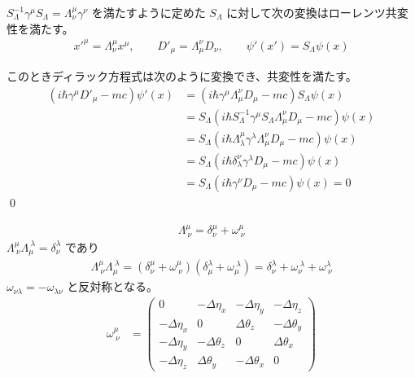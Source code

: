 \documentclass[uplatex,dvipdfmx,a4paper,11pt]{jlreq}
\makeatletter
\numberwithin{equation}{section}
\theoremstyle{definition}
\renewenvironment{proof}[1][\proofname]{\par
  \normalfont
  \topsep6\p@\@plus6\p@ \trivlist
  \item[\hskip\labelsep{\bfseries #1}\@addpunct{\bfseries}]\ignorespaces\quad\par
}{%
  \qed\endtrivlist\@endpefalse
}
\renewcommand\proofname{証明}
\makeatother
\begin{document}
\begin{theorem}[ローレンツ共変性]
  $S_\Lambda^{-1}\gamma^\mu S_\Lambda = \Lambda_\nu^\mu\gamma^\nu$ を満たすように定めた $S_\Lambda$ に対して次の変換はローレンツ共変性を満たす。
  \begin{align}
    x'^\mu = \Lambda^\mu_\nu x^\mu, \qquad D'_\mu = \Lambda_\mu^\nu D_\nu, \qquad \psi'(x') = S_\Lambda\psi(x)
  \end{align}
\end{theorem}
\begin{proof}
  このときディラック方程式は次のように変換でき、共変性を満たす。
  \begin{align}
    (i\hbar\gamma^\mu D'_\mu - mc)\psi'(x) & = (i\hbar\gamma^\mu \Lambda^\nu_\mu D_\mu - mc)S_\Lambda\psi(x)                           \\
                                           & = S_\Lambda(i\hbar S_\Lambda^{-1}\gamma^\mu S_\Lambda\Lambda_\mu^\nu D_\mu - mc)\psi(x)   \\
                                           & = S_\Lambda(i\hbar\Lambda_{\lambda}^{\mu}\gamma^\lambda\Lambda_\mu^\nu D_\mu - mc)\psi(x) \\
                                           & = S_\Lambda(i\hbar\delta_{\lambda}^\nu\gamma^\lambda D_\mu - mc)\psi(x)                   \\
                                           & = S_\Lambda(i\hbar\gamma^\nu D_\mu - mc)\psi(x) = 0
  \end{align}
\end{proof}

\begin{theorem}[無限小変換]
  \begin{align}
    \Lambda_{\ \nu}^\mu = \delta_\nu^\mu + \omega_{\ \nu}^\mu
  \end{align}
  $\Lambda_{\ \nu}^\mu\Lambda^{\ \lambda}_\mu = \delta_\nu^\lambda$ であり
  \begin{align}
    \Lambda_{\ \nu}^\mu\Lambda^{\ \lambda}_\mu = (\delta_\nu^\mu + \omega_{\ \nu}^\mu)(\delta^\lambda_\mu + \omega^{\ \lambda}_\mu) = \delta^\lambda_\nu + \omega^{\ \lambda}_\nu + \omega_{\ \nu}^\lambda
  \end{align}
  $\omega_{\nu\lambda} = -\omega_{\lambda\nu}$ と反対称となる。
  \begin{align}
    \omega_{\ \nu}^\mu & = \begin{pmatrix}
                             0             & -\Delta\eta_x   & -\Delta\eta_y   & -\Delta\eta_z   \\
                             -\Delta\eta_x & 0               & \Delta\theta_z  & -\Delta\theta_y \\
                             -\Delta\eta_y & -\Delta\theta_z & 0               & \Delta\theta_x  \\
                             -\Delta\eta_z & \Delta\theta_y  & -\Delta\theta_x & 0
                           \end{pmatrix}
  \end{align}
\end{theorem}
\end{document}
